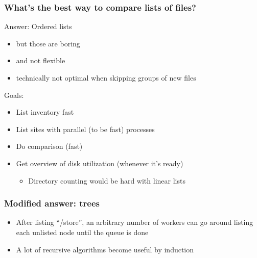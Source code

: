 \documentclass{beamer}
\begin{document}
\begin{frame}
  \frametitle{What's the best way to compare lists of files?}

  Answer: Ordered lists
  \begin{itemize}
  \item but those are boring
  \item and not flexible
  \item technically not optimal when skipping groups of new files
  \end{itemize}

  Goals:
  \begin{itemize}
  \item List inventory fast
  \item List sites with parallel (to be fast) processes
  \item Do comparison (fast)
  \item Get overview of disk utilization (whenever it's ready)
    \begin{itemize}
    \item Directory counting would be hard with linear lists
    \end{itemize}
  \end{itemize}

\end{frame}

\begin{frame}
  \frametitle{Modified answer: trees}

  \begin{center}
  \end{center}

  \vfill
  \begin{itemize}
  \item After listing ``/store'', an arbitrary number of workers can go around listing each unlisted node until the queue is done
  \item A lot of recursive algorithms become useful by induction
  \end{itemize}

\end{frame}
\end{document}
